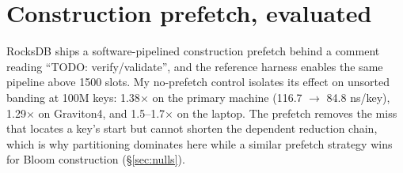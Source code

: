 \documentclass[a4paper,UKenglish,cleveref,autoref,thm-restate,anonymous]{lipics-v2021}
\begin{document}
\section{Construction prefetch, evaluated}\label{sec:prefetch}
RocksDB ships a software-pipelined construction prefetch behind a comment reading ``TODO: verify/validate'', and the reference harness enables the same pipeline above 1500 slots. My no-prefetch control isolates its effect on unsorted banding at 100M keys: 1.38$\times$ on the primary machine (116.7 $\to$ 84.8 ns/key), 1.29$\times$ on Graviton4, and 1.5--1.7$\times$ on the laptop. The prefetch removes the miss that locates a key's start but cannot shorten the dependent reduction chain, which is why partitioning dominates here while a similar prefetch strategy wins for Bloom construction (\S\ref{sec:nulls}).
\end{document}
